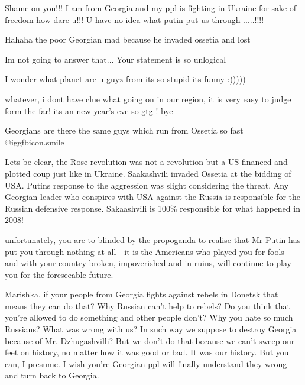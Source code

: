 \begin{itemize}
Shame on you!!! I am from Georgia and my ppl is fighting in Ukraine for sake of
freedom how dare u!!! U have no idea what putin put us through .....!!!!

\begin{itemize} %
Hahaha the poor Georgian mad because he invaded ossetia and lost


Im not going to answer that... Your statement is so unlogical


I wonder what planet are u guyz from its so stupid its funny :)))))


whatever, i dont have clue what going on in our region, it is very easy to
judge form the far! its an new year's eve so gtg ! bye


Georgians are there the same guys which run from Ossetia so fast  @igg{fbicon.smile} 


Lets be clear, the Rose revolution was not a revolution but a US financed and
plotted coup just like in Ukraine. Saakashvili invaded Ossetia at the bidding
of USA. Putins response to the aggression was slight considering the threat.
Any Georgian leader who conspires with USA against the Russia is responsible
for the Russian defensive response. Sakaashvili is 100\% responsible for what
happened in 2008!


unfortunately, you are to blinded by the propoganda to realise that Mr Putin
has put you through nothing at all - it is the Americans who played you for
fools - and with your country broken, impoverished and in ruins, will continue
to play you for the foreseeable future.


Marishka, if your people from Georgia fights against rebels in Donetsk that
means they can do that? Why Russian can't help to rebels? Do you think that
you're allowed to do something and other people don't? Why you hate so much
Russians? What was wrong with us? In such way we suppose to destroy Georgia
because of Mr. Dzhugashvilli? But we don't do that because we can't sweep our
feet on history, no matter how it was good or bad. It was our history. But you
can, I presume. I wish you're Georgian ppl will finally understand they wrong
and turn back to Georgia.


\end{itemize}
\end{itemize}
